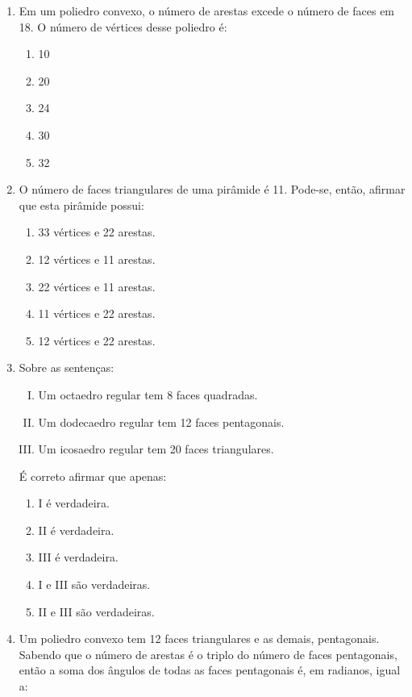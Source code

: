 \documentclass[twocolumn,oneside,a4paper,12pt]{article}
\begin{document}
\begin{enumerate}
\item Em um poliedro convexo, o número de arestas excede o número de faces em 18. O número de vértices desse poliedro é:
\begin{enumerate}
\item 10
\item 20
\item 24
\item 30
\item 32
\end{enumerate}

\item  O número de faces triangulares de uma pirâmide é 11. Pode-se, então, afirmar que esta pirâmide possui:
\begin{enumerate}
\item 33 vértices e 22 arestas.
\item 12 vértices e 11 arestas.
\item 22 vértices e 11 arestas.
\item 11 vértices e 22 arestas.
\item 12 vértices e 22 arestas.
\end{enumerate}

\item Sobre as sentenças:

\begin{enumerate}[I.]
\item Um octaedro regular tem 8 faces quadradas.
\item Um dodecaedro regular tem 12 faces pentagonais.
\item Um icosaedro regular tem 20 faces triangulares.
\end{enumerate}
É correto afirmar que apenas:
\begin{enumerate}
\item I é verdadeira.
\item II é verdadeira.
\item III é verdadeira.
\item I e III são verdadeiras.
\item II e III são verdadeiras.
\end{enumerate}

\item Um poliedro convexo tem 12 faces triangulares e as demais, pentagonais. Sabendo que o número de arestas é o triplo do número de faces pentagonais, então a soma dos ângulos de todas as faces pentagonais é, em radianos, igual a:


\end{enumerate}
\end{document}
